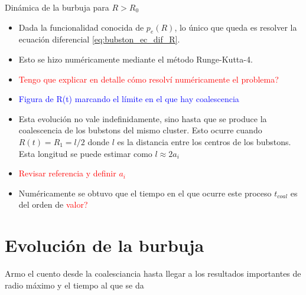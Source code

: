 \documentclass[aps,prb,twocolumn,superscriptaddress,floatfix,longbibliography,10pt]{revtex4-2}
\newcounter{para}
\begin{document}
Dinámica de la burbuja para $R>R_0$
\begin{itemize}
  \item Dada la funcionalidad conocida de $p_e(R)$, lo único que queda es resolver la ecuación diferencial \ref{eq:bubston_ec_dif_R}.
  \item Esto se hizo numéricamente mediante el método Runge-Kutta-4.
  \item \textcolor{red}{Tengo que explicar en detalle cómo resolví numéricamente el problema?}
  \item \textcolor{blue}{Figura de R(t) marcando el límite en el que hay coalescencia}
  \item Esta evolución no vale indefinidamente, sino hasta que se produce la coalescencia de los bubstons del mismo cluster. Esto ocurre cuando $R(t) = R_1=l/2$ donde $l$ es la distancia entre los centros de los bubstons. Esta longitud se puede estimar como $l \approx 2a_i$
  \item \textcolor{red}{Revisar referencia y definir $a_i$}
  \item Numéricamente se obtuvo que el tiempo en el que ocurre este proceso $t_{coal}$ es del orden de \textcolor{red}{valor?}
\end{itemize}

\section{Evolución de la burbuja}

Armo el cuento desde la coalesciancia hasta llegar a los resultados importantes de radio máximo y el tiempo al que se da
\end{document}
